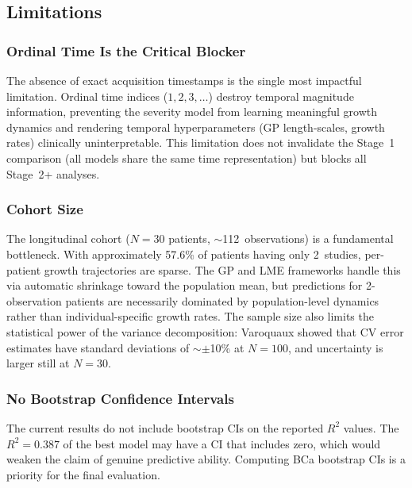 \subsection{Limitations}
\label{sec:conc:limitations}

\subsubsection{Ordinal Time Is the Critical Blocker}

The absence of exact acquisition timestamps is the single most impactful
limitation. Ordinal time indices ($1, 2, 3, \ldots$) destroy temporal
magnitude information, preventing the severity model from learning meaningful
growth dynamics and rendering temporal hyperparameters (GP length-scales,
growth rates) clinically uninterpretable. This limitation does not invalidate
the Stage~1 comparison (all models share the same time representation) but
blocks all Stage~2+ analyses.

\subsubsection{Cohort Size}

The longitudinal cohort ($N = 30$ patients, $\sim$112~observations) is a
fundamental bottleneck. With approximately 57.6\% of patients having only
2~studies, per-patient growth trajectories are sparse. The GP and LME
frameworks handle this via automatic shrinkage toward the population mean,
but predictions for 2-observation patients are necessarily dominated by
population-level dynamics rather than individual-specific growth rates.
The sample size also limits the statistical power of the variance
decomposition: Varoquaux \cite{varoquaux2018cv} showed that CV error
estimates have standard deviations of $\sim$$\pm$10\% at $N = 100$, and
uncertainty is larger still at $N = 30$.

\subsubsection{No Bootstrap Confidence Intervals}

The current results do not include bootstrap CIs on the reported $R^2$
values. The $R^2 = 0.387$ of the best model may have a CI that includes
zero, which would weaken the claim of genuine predictive ability.
Computing BCa bootstrap CIs is a priority for the final evaluation.

